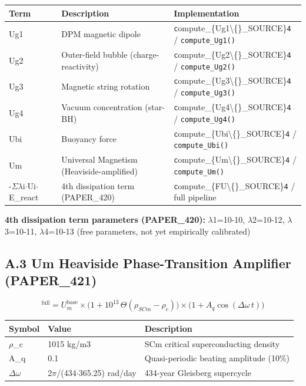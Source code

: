\documentclass[11pt]{article}
\begin{document}
\begin{center}
\begin{longtable}{lll}
\toprule
Term & Description & Implementation \tabularnewline
\midrule
\endhead
Ug1 & DPM magnetic dipole & \verb|c|ompute\_\{Ug1\textbackslash\{\}\_SOURCE\}\verb|4| / \verb|compute_Ug1()| \tabularnewline
Ug2 & Outer-field bubble (charge-reactivity) & \verb|c|ompute\_\{Ug2\textbackslash\{\}\_SOURCE\}\verb|4| / \verb|compute_Ug2()| \tabularnewline
Ug3 & Magnetic string rotation & \verb|c|ompute\_\{Ug3\textbackslash\{\}\_SOURCE\}\verb|4| / \verb|compute_Ug3()| \tabularnewline
Ug4 & Vacuum concentration (star-BH) & \verb|c|ompute\_\{Ug4\textbackslash\{\}\_SOURCE\}\verb|4| / \verb|compute_Ug4()| \tabularnewline
Ubi & Buoyancy force & \verb|c|ompute\_\{Ubi\textbackslash\{\}\_SOURCE\}\verb|4| / \verb|compute_Ubi()| \tabularnewline
Um & Universal Magnetism (Heaviside-amplified) & \verb|c|ompute\_\{Um\textbackslash\{\}\_SOURCE\}\verb|4| / \verb|compute_Um()| \tabularnewline
-$\Sigma$$\lambda$i$\cdot$Ui$\cdot$E\_react & 4th dissipation term (PAPER\_420) & \verb|c|ompute\_\{FU\textbackslash\{\}\_SOURCE\}\verb|4| / full pipeline \tabularnewline
\bottomrule
\end{longtable}
\end{center}

\textbf{4th dissipation term parameters (PAPER\_420):} $\lambda$1=10-10, $\lambda$2=10-12, $\lambda$3=10-11, $\lambda$4=10-13 (free parameters, not yet empirically calibrated)

\subsection*{A.3 Um Heaviside Phase-Transition Amplifier (PAPER\_421)}

$$^{\mathrm{full}} = U_m^{\mathrm{base}} \times \bigl(1 + 10^{13}\,\Theta(\rho_{SCm} - \rho_c)\bigr) \times \bigl(1 + A_q\cos(\Delta\omega\,t)\bigr)$$

\begin{center}
\begin{longtable}{lll}
\toprule
Symbol & Value & Description \tabularnewline
\midrule
\endhead
$\rho$\_c & 1015 kg/m3 & SCm critical superconducting density \tabularnewline
A\_q & 0.1 & Quasi-periodic beating amplitude (10\%) \tabularnewline
$\Delta$$\omega$ & 2$\pi$/(434$\cdot$365.25) rad/day & 434-year Gleisberg supercycle \tabularnewline
\bottomrule
\end{longtable}
\end{center}
\end{document}
